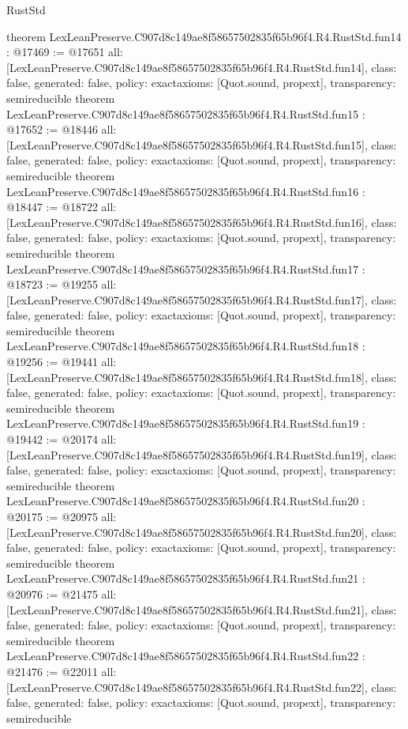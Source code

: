 \begin{lexlean}{RustStd}
\begin{coremodule}
{}
theorem LexLeanPreserve.C907d8c149ae8f58657502835f65b96f4.R4.RustStd.fun14 : @17469 := @17651 {
  all: [LexLeanPreserve.C907d8c149ae8f58657502835f65b96f4.R4.RustStd.fun14],
  class: false,
  generated: false,
  policy: exact{axioms: [Quot.sound, propext]},
  transparency: semireducible
}
theorem LexLeanPreserve.C907d8c149ae8f58657502835f65b96f4.R4.RustStd.fun15 : @17652 := @18446 {
  all: [LexLeanPreserve.C907d8c149ae8f58657502835f65b96f4.R4.RustStd.fun15],
  class: false,
  generated: false,
  policy: exact{axioms: [Quot.sound, propext]},
  transparency: semireducible
}
theorem LexLeanPreserve.C907d8c149ae8f58657502835f65b96f4.R4.RustStd.fun16 : @18447 := @18722 {
  all: [LexLeanPreserve.C907d8c149ae8f58657502835f65b96f4.R4.RustStd.fun16],
  class: false,
  generated: false,
  policy: exact{axioms: [Quot.sound, propext]},
  transparency: semireducible
}
theorem LexLeanPreserve.C907d8c149ae8f58657502835f65b96f4.R4.RustStd.fun17 : @18723 := @19255 {
  all: [LexLeanPreserve.C907d8c149ae8f58657502835f65b96f4.R4.RustStd.fun17],
  class: false,
  generated: false,
  policy: exact{axioms: [Quot.sound, propext]},
  transparency: semireducible
}
theorem LexLeanPreserve.C907d8c149ae8f58657502835f65b96f4.R4.RustStd.fun18 : @19256 := @19441 {
  all: [LexLeanPreserve.C907d8c149ae8f58657502835f65b96f4.R4.RustStd.fun18],
  class: false,
  generated: false,
  policy: exact{axioms: [Quot.sound, propext]},
  transparency: semireducible
}
theorem LexLeanPreserve.C907d8c149ae8f58657502835f65b96f4.R4.RustStd.fun19 : @19442 := @20174 {
  all: [LexLeanPreserve.C907d8c149ae8f58657502835f65b96f4.R4.RustStd.fun19],
  class: false,
  generated: false,
  policy: exact{axioms: [Quot.sound, propext]},
  transparency: semireducible
}
theorem LexLeanPreserve.C907d8c149ae8f58657502835f65b96f4.R4.RustStd.fun20 : @20175 := @20975 {
  all: [LexLeanPreserve.C907d8c149ae8f58657502835f65b96f4.R4.RustStd.fun20],
  class: false,
  generated: false,
  policy: exact{axioms: [Quot.sound, propext]},
  transparency: semireducible
}
theorem LexLeanPreserve.C907d8c149ae8f58657502835f65b96f4.R4.RustStd.fun21 : @20976 := @21475 {
  all: [LexLeanPreserve.C907d8c149ae8f58657502835f65b96f4.R4.RustStd.fun21],
  class: false,
  generated: false,
  policy: exact{axioms: [Quot.sound, propext]},
  transparency: semireducible
}
theorem LexLeanPreserve.C907d8c149ae8f58657502835f65b96f4.R4.RustStd.fun22 : @21476 := @22011 {
  all: [LexLeanPreserve.C907d8c149ae8f58657502835f65b96f4.R4.RustStd.fun22],
  class: false,
  generated: false,
  policy: exact{axioms: [Quot.sound, propext]},
  transparency: semireducible
}
\end{coremodule}
\end{lexlean}
